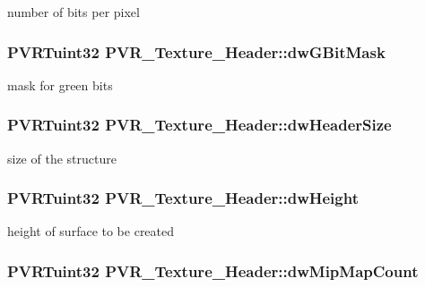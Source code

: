 number of bits per pixel \hypertarget{struct_p_v_r___texture___header_aaad072521ec185cd73c58b6598ab7973}{
\subsubsection[{dw\+G\+Bit\+Mask}]{\setlength{\rightskip}{0pt plus 5cm}P\+V\+R\+Tuint32 P\+V\+R\+\_\+\+Texture\+\_\+\+Header\+::dw\+G\+Bit\+Mask}}\label{struct_p_v_r___texture___header_aaad072521ec185cd73c58b6598ab7973}
mask for green bits \hypertarget{struct_p_v_r___texture___header_a08132ef78a2d3bf45f814dbf7bfc954c}{
\subsubsection[{dw\+Header\+Size}]{\setlength{\rightskip}{0pt plus 5cm}P\+V\+R\+Tuint32 P\+V\+R\+\_\+\+Texture\+\_\+\+Header\+::dw\+Header\+Size}}\label{struct_p_v_r___texture___header_a08132ef78a2d3bf45f814dbf7bfc954c}
size of the structure \hypertarget{struct_p_v_r___texture___header_aa27340dc3ec51e89689679aede88fd9c}{
\subsubsection[{dw\+Height}]{\setlength{\rightskip}{0pt plus 5cm}P\+V\+R\+Tuint32 P\+V\+R\+\_\+\+Texture\+\_\+\+Header\+::dw\+Height}}\label{struct_p_v_r___texture___header_aa27340dc3ec51e89689679aede88fd9c}
height of surface to be created \hypertarget{struct_p_v_r___texture___header_a42ff87a8aa5e04190d3cc62160962cd3}{
\subsubsection[{dw\+Mip\+Map\+Count}]{\setlength{\rightskip}{0pt plus 5cm}P\+V\+R\+Tuint32 P\+V\+R\+\_\+\+Texture\+\_\+\+Header\+::dw\+Mip\+Map\+Count}}\label{struct_p_v_r___texture___header_a42ff87a8aa5e04190d3cc62160962cd3}
